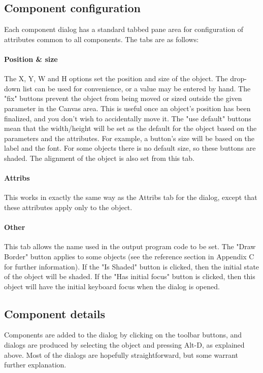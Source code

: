 \subsection*{Component configuration}

Each component dialog has a standard tabbed pane area for configuration
of attributes common to all components. The tabs are as follows:

\paragraph{Position \& size}
The X, Y, W and H options set the position and size of the object. The
drop-down list can be used for convenience, or a value may be entered
by hand. The "fix" buttons prevent the
object from being moved or sized outside the given parameter in the
Canvas area. This is useful once an object's position
has been finalized, and you don't wish to accidentally
move it. The "use default" buttons mean
that the width/height will be set as the default for the object based
on the parameters and the attributes. For example, a
button's size will be based on the label and the font.
For some objects there is no default size, so these buttons are shaded.
The alignment of the object is also set from this tab.

\paragraph{Attribs}
This works in exactly the same way as the Attribs tab for the dialog,
except that these attributes apply only to the object.

\paragraph{Other}
This tab allows the name used in the output program code to be set.
The "Draw
Border" button applies to some objects (see the reference
section in Appendix C for further information). If the
"Is Shaded" button is clicked, then the
initial state of the object will be shaded. If the "Has
initial focus" button is clicked, then this object will
have the initial keyboard focus when the dialog is
opened.

\subsection*{Component details}

Components are added to the dialog by clicking on the toolbar buttons,
and dialogs are produced by selecting the object and pressing Alt-D, as
explained above. Most of the dialogs are hopefully straightforward, but
some warrant further explanation.

